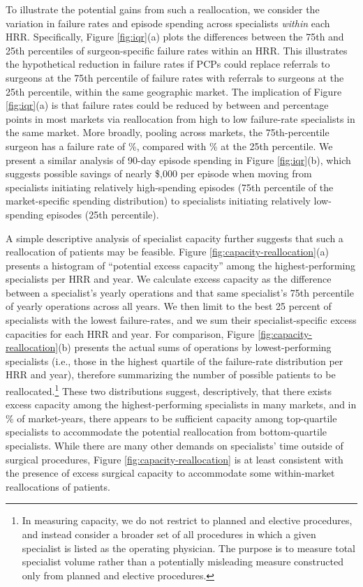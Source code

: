 \documentclass[12pt]{article}
\begin{document}
To illustrate the potential gains from such a reallocation, we consider the variation in failure rates and episode spending across specialists \emph{within} each HRR. Specifically, Figure \ref{fig:iqr}(a) plots the differences between the 75th and 25th percentiles of surgeon-specific failure rates within an HRR. This illustrates the hypothetical reduction in failure rates if PCPs could replace referrals to surgeons at the 75th percentile of failure rates with referrals to surgeons at the 25th percentile, within the same geographic market. The implication of Figure \ref{fig:iqr}(a) is that failure rates could be reduced by between \failureIQRPten{} and \failureIQRPninety{} percentage points in most markets via reallocation from high to low failure-rate specialists in the same market. More broadly, pooling across markets, the 75th-percentile surgeon has a failure rate of \specFailurePseventyfive{}\%, compared with \specFailurePtwentyfive{}\% at the 25th percentile. We present a similar analysis of 90-day episode spending in Figure \ref{fig:iqr}(b), which suggests possible savings of nearly \$\paymentIQRMedian{},000 per episode when moving from specialists initiating relatively high-spending episodes (75th percentile of the market-specific spending distribution) to specialists initiating relatively low-spending episodes (25th percentile).

A simple descriptive analysis of specialist capacity further suggests that such a reallocation of patients may be feasible. Figure \ref{fig:capacity-reallocation}(a) presents a histogram of ``potential excess capacity'' among the highest-performing specialists per HRR and year. We calculate excess capacity as the difference between a specialist's yearly operations and that same specialist's 75th percentile of yearly operations across all years. We then limit to the best 25 percent of specialists with the lowest failure-rates, and we sum their specialist-specific excess capacities for each HRR and year. For comparison, Figure \ref{fig:capacity-reallocation}(b) presents the actual sums of operations by lowest-performing specialists (i.e., those in the highest quartile of the failure-rate distribution per HRR and year), therefore summarizing the number of possible patients to be reallocated.\footnote{In measuring capacity, we do not restrict to planned and elective procedures, and instead consider a broader set of all procedures in which a given specialist is listed as the operating physician. The purpose is to measure total specialist volume rather than a potentially misleading measure constructed only from planned and elective procedures.} These two distributions suggest, descriptively, that there exists excess capacity among the highest-performing specialists in many markets, and in \capacitySuffPct{}\% of market-years, there appears to be sufficient capacity among top-quartile specialists to accommodate the potential reallocation from bottom-quartile specialists. While there are many other demands on specialists' time outside of surgical procedures, Figure \ref{fig:capacity-reallocation} is at least consistent with the presence of excess surgical capacity to accommodate some within-market reallocations of patients.
\end{document}
